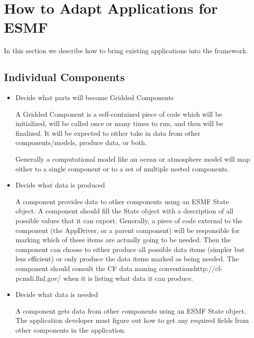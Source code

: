 
\section{How to Adapt Applications for ESMF}
\label{sec:Adoption}

In this section we describe how to bring existing applications 
into the framework.

\subsection{Individual Components}

\begin{itemize}

\item Decide what parts will become Gridded Components 

A Gridded Component is a self-contained
piece of code which will be initialized, will be called once or many times
to run, and then will be finalized.  It will be expected to either take in
data from other components/models, produce data, or both.

Generally a computational model like an ocean or atmosphere model will
map either to a single component or to a set of multiple nested
components.

\item Decide what data is produced 

A component provides data to other components using an ESMF State
object.  A component should fill the State object with a description of
all possible values that it can export.  Generally, a piece of code
external to the component (the AppDriver, or a parent component) will 
be responsible for marking which of these items are actually going to
be needed.  Then the component can choose to either produce all possible
data items (simpler but less efficient) or only produce the data items
marked as being needed.  The component should consult the \htmladdnormallink
{CF data naming conventions}{http://cf-pcmdi.llnl.gov/} when it is listing
what data it can produce.

\item Decide what data is needed 

A component gets data from other components using an ESMF State object.
The application developer must figure out how to get any required 
fields from other components in the application.


\end{itemize}
